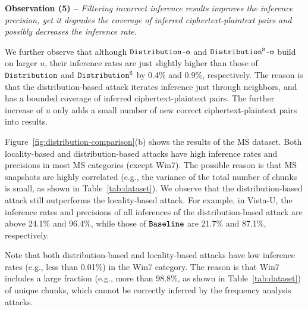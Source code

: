 
{\bf Observation (5) --} {\em Filtering incorrect inference results improves
the inference precision, yet it degrades the coverage of inferred
ciphertext-plaintext pairs and possibly decreases the inference rate.
} 

We further observe that although $\tt Distribution$-$\tt o$ and $\tt
Distribution^S$-$\tt o$ build on larger $u$, their inference rates are just
slightly higher than those of $\tt Distribution$ and $\tt Distribution^S$ by
0.4\% and 0.9\%, respectively. The reason is that the distribution-based
attack iterates inference just through neighbors, and has a bounded coverage
of inferred ciphertext-plaintext pairs. The further increase of $u$ only adds
a small number of new correct  ciphertext-plaintext pairs into results. 

Figure~\ref{fig:distribution-comparison}(b) shows the
results of the MS dataset. Both locality-based and distribution-based attacks
have high inference rates and precisions in most MS categories (except Win7).
The possible reason is that MS snapshots are highly correlated (e.g., the
variance of the total number of chunks is small, as shown in
Table~\ref{tab:dataset}).  We observe that the distribution-based attack still
outperforms the locality-based attack. For example, in Vista-U, the inference
rates and precisions of all inferences of the distribution-based attack are
above 24.1\% and 96.4\%, while those of $\tt Baseline$ are 21.7\% and 87.1\%,
respectively. 

Note that both  distribution-based and  locality-based attacks have low
inference rates (e.g., less than 0.01\%) in the Win7 category. The reason is
 that Win7 includes a large fraction (e.g., more than 98.8\%, as shown in
Table~\ref{tab:dataset}) of unique chunks, which cannot be correctly
inferred by the frequency analysis attacks. 




